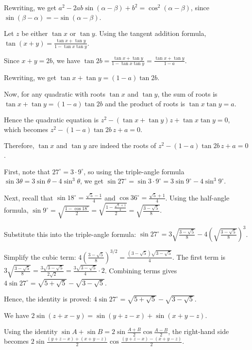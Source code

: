   Rewriting, we get $a^2 - 2ab \sin(\alpha - \beta) + b^2 = \cos^2(\alpha - \beta)$, since $\sin(\beta
  - \alpha) = -\sin(\alpha - \beta)$.
\item Let $z$ be either $\tan x$ or $\tan y$. Using the tangent addition formula, $\tan(x+y) = \frac{\tan x
  + \tan y}{1 - \tan x \tan y}$.

  Since $x+y = 2b$, we have $\tan 2b = \frac{\tan x + \tan y}{1 - \tan x \tan y} = \frac{\tan x + \tan y}{1
    - a}$.

  Rewriting, we get $\tan x + \tan y = (1 - a) \tan 2b$.

  Now, for any quadratic with roots $\tan x$ and $\tan y$, the sum of roots is $\tan x + \tan y = (1 -
  a) \tan 2b$ and the product of roots is $\tan x \tan y = a$.

  Hence the quadratic equation is $z^2 - (\tan x + \tan y) z + \tan x \tan y = 0$, which becomes $z^2 -
  (1-a) \tan 2b \, z + a = 0$.

  Therefore, $\tan x$ and $\tan y$ are indeed the roots of $z^2 - (1-a) \tan 2b \, z + a = 0$.
\item First, note that $27^\circ = 3 \cdot 9^\circ$, so using the triple-angle formula $\sin 3\theta =
  3\sin\theta - 4\sin^3\theta$, we get $\sin 27^\circ = \sin 3 \cdot 9^\circ = 3 \sin 9^\circ - 4 \sin^3
  9^\circ$.

  Next, recall that $\sin 18^\circ = \frac{\sqrt{5}-1}{4}$ and $\cos 36^\circ = \frac{\sqrt{5}+1}{4}$. Using
  the half-angle formula, $\sin 9^\circ = \sqrt{\frac{1 - \cos 18^\circ}{2}} = \sqrt{\frac{1
      - \frac{\sqrt{5}+1}{4}}{2}} = \sqrt{\frac{3 - \sqrt{5}}{8}}$.

  Substitute this into the triple-angle formula: $\sin 27^\circ = 3 \sqrt{\frac{3 - \sqrt{5}}{8}} -
  4 \left(\sqrt{\frac{3 - \sqrt{5}}{8}}\right)^3$.

  Simplify the cubic term: $4 \left(\frac{3 - \sqrt{5}}{8}\right)^{3/2} = \frac{(3 - \sqrt{5}) \sqrt{3
      - \sqrt{5}}}{4}$. The first term is $3 \sqrt{\frac{3 - \sqrt{5}}{8}} = \frac{3 \sqrt{3
      - \sqrt{5}}}{2 \sqrt{2}} = \frac{3 \sqrt{3 - \sqrt{5}}}{4} \cdot 2$. Combining terms gives
  $4 \sin 27^\circ = \sqrt{5 + \sqrt{5}} - \sqrt{3 - \sqrt{5}}$.

  Hence, the identity is proved: $4 \sin 27^\circ = \sqrt{5 + \sqrt{5}} - \sqrt{3 - \sqrt{5}}$.
\item We have $2\sin(z+x-y)=\sin(y+z-x)+\sin(x+y-z)$.

  Using the identity $\sin A+\sin B=2\sin\frac{A+B}{2}\cos\frac{A-B}{2}$, the right-hand side becomes
  $2\sin\frac{(y+z-x)+(x+y-z)}{2}\cos\frac{(y+z-x)-(x+y-z)}{2}$.

